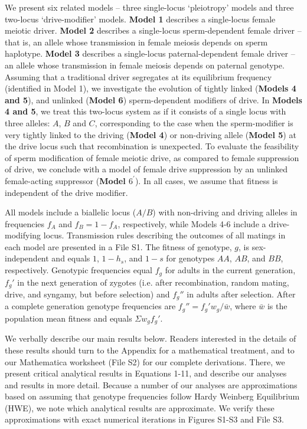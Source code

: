 \documentclass[12pt,letterpaper]{article}
\begin{document}
We present six related models -- three single-locus `pleiotropy' models and three two-locus `drive-modifier' models.
	{\bf{Model 1}} describes a single-locus female meiotic driver.  
	{\bf{Model 2}} describes a single-locus sperm-dependent female driver -- that is, an allele whose transmission in female meiosis depends on sperm haplotype. 
	{\bf{Model 3}} describes a single-locus paternal-dependent female driver -- an allele whose transmission in female meiosis depends on paternal genotype. 
Assuming that a traditional driver segregates at its equilibrium frequency (identified in Model 1), 
	we investigate the evolution of tightly linked ({\bf{Models 4 and 5}}), and unlinked ({\bf{Model 6}}) 
	sperm-dependent modifiers of drive. 
In {\bf{Models 4 and 5}}, we treat this two-locus system as if it consists of
	a single locus with three alleles: $A$, $B$ and $C$, corresponding to the case when the
	sperm-modifier is very tightly linked to the driving ({\bf{Model 4}}) or non-driving allele ({\bf{Model 5}})
 	at the drive locus such that recombination is unexpected. 
To evaluate the feasibility of sperm modification of female meiotic drive, as compared to female suppression of drive, 
	we conclude with a model of female drive suppression by an unlinked female-acting suppressor ({\bf{Model $6^\prime$}}). 
In all cases, we assume that fitness is independent of the drive modifier. 
 \newline 

All models include a biallelic locus ($A/B$) with non-driving and driving alleles in frequencies $f_A$ and $f_B = 1 - f_A$, 
	respectively, while Models 4-6 include a drive-modifying locus.  
Transmission rules describing the outcomes of all matings in each model are presented in a File S1. 
The fitness of genotype, $g$, is sex-independent and equals $1$, $1-h_s$, and $1-s$ for genotypes $AA$, $AB$, and $BB$, respectively. %
Genotypic frequencies  equal  $f_g$ for adults in the current generation, 
	$f_g'$ in the next generation of zygotes (i.e. after recombination, random mating, drive, and syngamy, but before selection)
	and $f_g''$ in adults after selection. 
After a complete generation genotype frequencies are $f_g'' = f_g' w_g/\bar{w}$, where $\bar{w}$ is the population mean fitness and equals $\Sigma w_g f_g'$.  \newline

We verbally describe our main results below.  
Readers interested in the details of these results should turn to the Appendix for a mathematical treatment, 
	and to our Mathematica worksheet  (File S2) for our complete derivations. 
There, we present critical analytical results in Equations 1-11, and describe our analyses and results in more detail.  
Because a number of our analyses are approximations based on assuming
that genotype frequencies follow Hardy Weinberg Equilibrium (HWE), we note which analytical results are approximate. 
We verify these approximations with exact numerical iterations in Figures S1-S3 and File S3.
\end{document}
